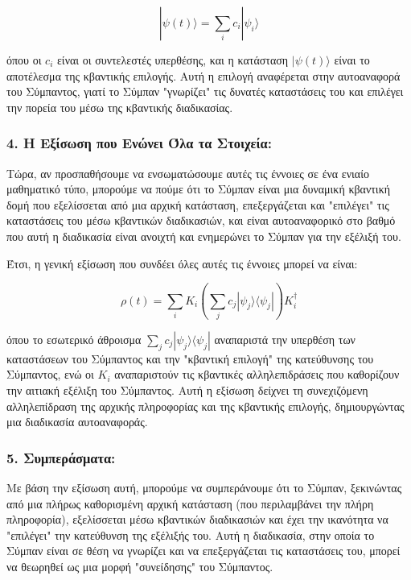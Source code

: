 \documentclass[a4paper,11pt]{article}
\begin{document}
{{{\[|\psi(t)\rangle = \sum_i c_i |\psi_i\rangle\]}}}

όπου οι {{\(c_i\)}} είναι οι συντελεστές υπερθέσης, και η κατάσταση
{{\(|\psi(t)\rangle\)}} είναι το αποτέλεσμα της κβαντικής επιλογής. Αυτή
η επιλογή αναφέρεται στην αυτοαναφορά του Σύμπαντος, γιατί το Σύμπαν
"γνωρίζει" τις δυνατές καταστάσεις του και επιλέγει την πορεία του μέσω
της κβαντικής διαδικασίας.

\subsubsection{4. \textbf{Η Εξίσωση που Ενώνει Όλα τα Στοιχεία:}}\label{η-εξίσωση-που-ενώνει-όλα-τα-στοιχεία}



Τώρα, αν προσπαθήσουμε να ενσωματώσουμε αυτές τις έννοιες σε ένα ενιαίο
μαθηματικό τύπο, μπορούμε να πούμε ότι το Σύμπαν είναι μια δυναμική
κβαντική δομή που εξελίσσεται από μια αρχική κατάσταση, επεξεργάζεται
και "επιλέγει" τις καταστάσεις του μέσω κβαντικών διαδικασιών, και είναι
αυτοαναφορικό στο βαθμό που αυτή η διαδικασία είναι ανοιχτή και
ενημερώνει το Σύμπαν για την εξέλιξή του.

Έτσι, η γενική εξίσωση που συνδέει όλες αυτές τις έννοιες μπορεί να
είναι:

{{{\[\rho(t) = \sum_i K_i \left( \sum_j c_j |\psi_j \rangle \langle \psi_j | \right) K_i^\dagger\]}}}

όπου το εσωτερικό άθροισμα
{{\(\sum_j c_j |\psi_j \rangle \langle \psi_j |\)}} αναπαριστά την
υπερθέση των καταστάσεων του Σύμπαντος και την "κβαντική επιλογή" της
κατεύθυνσης του Σύμπαντος, ενώ οι {{\(K_i\)}} αναπαριστούν τις κβαντικές
αλληλεπιδράσεις που καθορίζουν την αιτιακή εξέλιξη του Σύμπαντος. Αυτή η
εξίσωση δείχνει τη συνεχιζόμενη αλληλεπίδραση της αρχικής πληροφορίας
και της κβαντικής επιλογής, δημιουργώντας μια διαδικασία αυτοαναφοράς.

\subsubsection{5. \textbf{Συμπεράσματα:}}\label{συμπεράσματα-3}

Με βάση την εξίσωση αυτή, μπορούμε να συμπεράνουμε ότι το Σύμπαν,
ξεκινώντας από μια πλήρως καθορισμένη αρχική κατάσταση (που περιλαμβάνει
την πλήρη πληροφορία), εξελίσσεται μέσω κβαντικών διαδικασιών και έχει
την ικανότητα να "επιλέγει" την κατεύθυνση της εξέλιξής του. Αυτή η
διαδικασία, στην οποία το Σύμπαν είναι σε θέση να γνωρίζει και να
επεξεργάζεται τις καταστάσεις του, μπορεί να θεωρηθεί ως μια μορφή
"συνείδησης" του Σύμπαντος.
\end{document}
